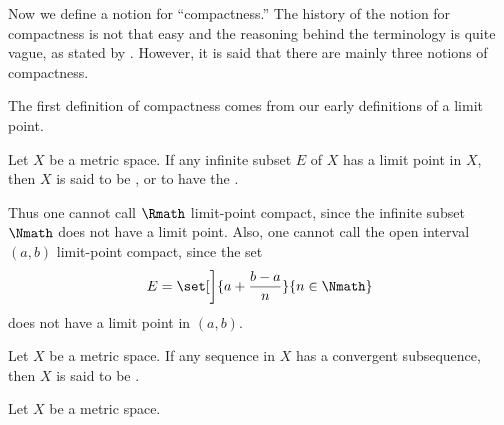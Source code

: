 \label{sec:mcptcnt}

Now we define a notion for ``compactness.''
The history of the notion for compactness is not that easy
and the reasoning behind the terminology is quite vague,
as stated by \textcite{cpt-hist}.
However, it is said that
there are mainly three notions of compactness.

The first definition of compactness
comes from our early definitions of a limit point.

\begin{definition}
    \label{def:limptcpt}
    Let \(X\) be a metric space.
    If any infinite subset \(E\) of \(X\) has a limit point in \(X\),
    then \(X\) is said
    to be ,
    or to have the .
\end{definition}

Thus one cannot call \(\Rmath\) limit-point compact,
since the infinite subset \(\Nmath\) does not have a limit point.
Also, one cannot call the open interval \((a,b)\) limit-point compact,
since the set
\[
    E
    =\set[\bigg]{a+\frac{b-a}{n}}{n\in\Nmath}
\]
does not have a limit point in \((a,b)\).

\begin{definition}
    \label{def:seqcpt}
    Let \(X\) be a metric space.
    If any sequence in \(X\) has a convergent subsequence,
    then \(X\) is said
    to be .
\end{definition}

\begin{definition}
    \label{def:mcpt}
    Let \(X\) be a metric space.
\end{definition}